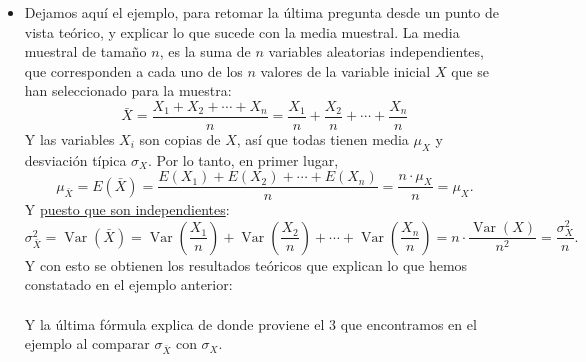 \begin{itemize}
\begin{ejemplo}
        \end{ejemplo}

\item Dejamos aquí el ejemplo, para retomar la última pregunta desde un punto de vista teórico, y explicar lo que sucede con la media muestral. La media muestral de tamaño $n$, es la suma de $n$ variables aleatorias {\sf independientes}, que corresponden a cada uno de los $n$ valores de la variable inicial $X$ que se han seleccionado para la muestra:
    \[\bar X=\dfrac{X_1+X_2+\cdots+X_n}{n}=\dfrac{X_1}{n}+\dfrac{X_2}{n}+\cdots+\dfrac{X_n}{n}\]
    Y las variables $X_i$ son copias de $X$, así que todas tienen media $\mu_X$ y desviación típica $\sigma_X$. Por lo tanto, en primer lugar,
    \[\mu_{\bar X}=E(\bar X)=\dfrac{E(X_1)+E(X_2)+\cdots+E(X_n)}{n}=\dfrac{n\cdot \mu_X}{n}=\mu_X.\]
    Y \underline{\sf puesto que son independientes}:
    \[\sigma^2_{\bar X}=\operatorname{Var}(\bar X)=\operatorname{Var}\left(\dfrac{X_1}{n}\right)+\operatorname{Var}\left(\dfrac{X_2}{n}\right)+\cdots+\operatorname{Var}\left(\dfrac{X_n}{n}\right)=
    n\cdot\dfrac{\operatorname{Var}(X)}{n^2}=\dfrac{\sigma^2_X}{n}.\]
    Y con esto se obtienen los resultados teóricos que explican lo que hemos constatado en el ejemplo anterior:\\[3mm]
        \\[3mm]
        Y la última fórmula explica de donde proviene el $3$ que encontramos en el ejemplo al comparar $\sigma_{\bar X}$ con $\sigma_X$.


\end{itemize}
